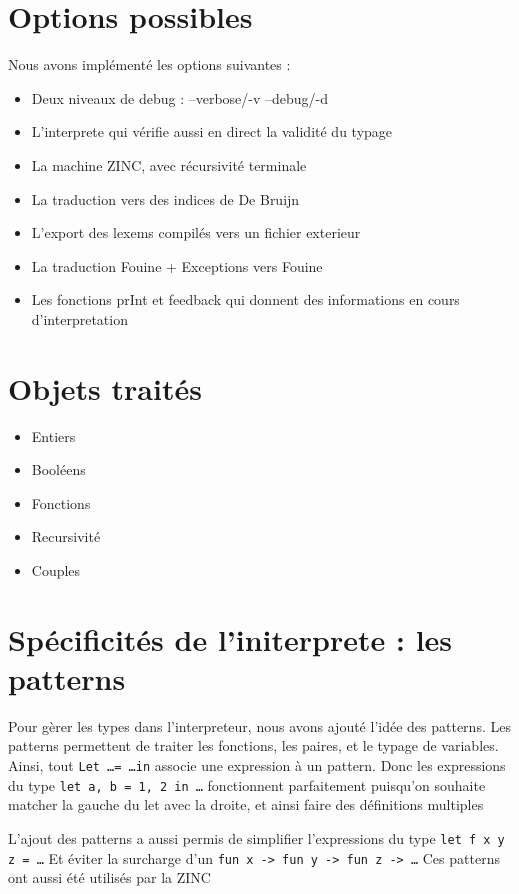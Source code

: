 \documentclass{article}
\begin{document}
\section{Options possibles}
Nous avons implémenté les options suivantes : 
\begin{itemize}
\item Deux niveaux de debug : –verbose/-v –debug/-d
\item L’interprete qui vérifie aussi en direct la validité du typage
\item La machine ZINC, avec récursivité terminale
\item La traduction vers des indices de De Bruijn
\item L’export des lexems compilés vers un fichier exterieur
\item La traduction Fouine + Exceptions vers Fouine
\item Les fonctions prInt et feedback qui donnent des informations en cours d’interpretation
\end{itemize}

\section{Objets traités}
\begin{itemize}
\item Entiers
\item Booléens
\item Fonctions
\item Recursivité
\item Couples
\end{itemize}

\section{Spécificités de l'initerprete : les patterns}
Pour  gèrer  les  types  dans  l’interpreteur,  nous  avons  ajouté  l’idée  des  patterns. 
Les patterns permettent de traiter les fonctions, les paires, et le typage de variables. 
Ainsi, tout \texttt{Let \ldots = \ldots in} associe une expression à un pattern.
Donc  les  expressions  du  type \texttt{let a, b = 1, 2 in \ldots} fonctionnent  parfaitement
puisqu’on souhaite matcher la gauche du let avec la droite, et ainsi faire des définitions 
multiples

L’ajout des patterns a aussi permis de simplifier l’expressions du type
\texttt{let f x y z = \ldots}
Et éviter la surcharge d’un
\texttt{fun x -> fun y -> fun z -> \ldots }
Ces patterns ont aussi été utilisés par la ZINC
\end{document}
